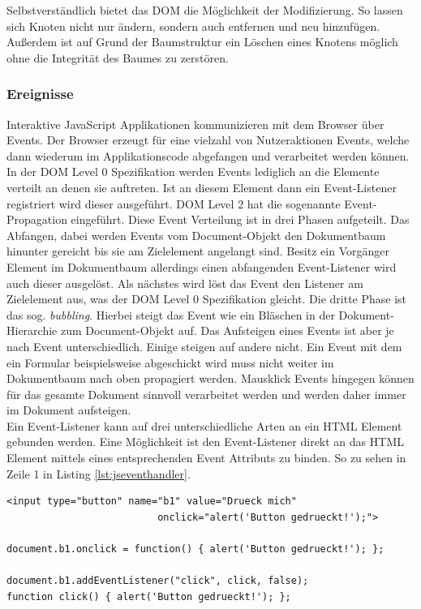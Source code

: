Selbstverständlich bietet das DOM die Möglichkeit der Modifizierung. So lassen sich Knoten nicht nur ändern, sondern auch entfernen und neu hinzufügen. Außerdem ist auf Grund der Baumstruktur ein Löschen eines Knotens möglich ohne die Integrität des Baumes zu zerstören.

\subsubsection{Ereignisse} Interaktive JavaScript Applikationen kommunizieren mit dem Browser über Events. Der Browser erzeugt für eine vielzahl von Nutzeraktionen Events, welche dann wiederum im Applikationscode abgefangen und verarbeitet werden können. In der DOM Level 0 Spezifikation werden Events lediglich an die Elemente verteilt an denen sie auftreten. Ist an diesem Element dann ein Event-Listener registriert wird dieser ausgeführt. DOM Level 2 hat die sogenannte Event-Propagation eingeführt. Diese Event Verteilung ist in drei Phasen aufgeteilt. Das Abfangen, dabei werden Events vom Document-Objekt den Dokumentbaum hinunter gereicht bis sie am Zielelement angelangt sind. Besitz ein Vorgänger Element im Dokumentbaum allerdings einen abfangenden Event-Listener wird auch dieser ausgelöst. Als nächstes wird löst das Event den Listener am Zielelement aus, was der DOM Level 0 Spezifikation gleicht. Die dritte Phase ist das sog. \textit{bubbling}. Hierbei steigt das Event wie ein Bläschen in der Dokument-Hierarchie zum Document-Objekt auf. Das Aufsteigen eines Events ist aber je nach Event unterschiedlich. Einige steigen auf andere nicht. Ein Event mit dem ein Formular beispielsweise abgeschickt wird muss nicht weiter im Dokumentbaum nach oben propagiert werden. Mausklick Events hingegen können für das gesamte Dokument sinnvoll verarbeitet werden und werden daher immer im Dokument aufsteigen.\\Ein Event-Listener kann auf drei unterschiedliche Arten an ein HTML Element gebunden werden. Eine Möglichkeit ist den Event-Listener direkt an das HTML Element mittels eines entsprechenden Event Attributs zu binden. So zu sehen in Zeile 1 in Listing \ref{lst:jseventhandler}. 

	\vspace{1em}
	\begin{lstlisting}[frame=htrbl, caption=JavaScript Event-Handler Beispiek, label=lst:jseventhandler]
<input type="button" name="b1" value="Drueck mich"
                          onclick="alert('Button gedrueckt!');">

document.b1.onclick = function() { alert('Button gedrueckt!'); };

document.b1.addEventListener("click", click, false);
function click() { alert('Button gedrueckt!'); };
	\end{lstlisting}

